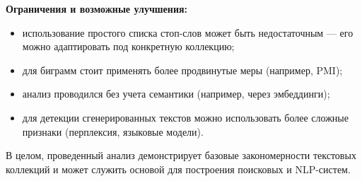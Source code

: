 \documentclass[11pt]{article}
\begin{document}
\textbf{Ограничения и возможные улучшения:}

\begin{itemize}
    \item использование простого списка стоп-слов может быть недостаточным — его
    можно адаптировать под конкретную коллекцию;
    \item для биграмм стоит применять более продвинутые меры (например, PMI);
    \item анализ проводился без учета семантики (например, через эмбеддинги);
    \item для детекции сгенерированных текстов можно использовать более сложные
    признаки (перплексия, языковые модели).
\end{itemize}

В целом, проведенный анализ демонстрирует базовые закономерности текстовых
коллекций и может служить основой для построения поисковых и NLP-систем.
\end{document}
